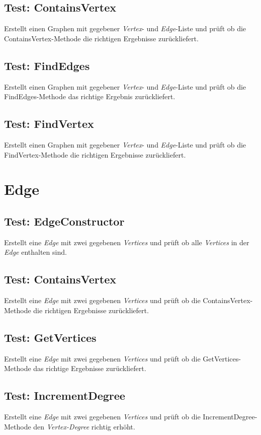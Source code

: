 \documentclass[13pt]{scrreprt}
\begin{document}
\subsection{Test: ContainsVertex}
Erstellt einen Graphen mit gegebener \textit{Vertex}- und \textit{Edge}-Liste und prüft ob die ContainsVertex-Methode die richtigen Ergebnisse zurückliefert.

\subsection{Test: FindEdges}
Erstellt einen Graphen mit gegebener \textit{Vertex}- und \textit{Edge}-Liste und prüft ob die FindEdges-Methode das richtige Ergebnis zurückliefert.

\subsection{Test: FindVertex}
Erstellt einen Graphen mit gegebener \textit{Vertex}- und \textit{Edge}-Liste und prüft ob die FindVertex-Methode die richtigen Ergebnisse zurückliefert.

\newpage
\section{Edge}

\subsection{Test: EdgeConstructor}
Erstellt eine \textit{Edge} mit  zwei gegebenen \textit{Vertices} und prüft ob alle \textit{Vertices} in der \textit{Edge} enthalten sind.

\subsection{Test: ContainsVertex}
Erstellt eine \textit{Edge} mit  zwei gegebenen \textit{Vertices} und prüft ob die ContainsVertex-Methode die richtigen Ergebnisse zurückliefert.

\subsection{Test: GetVertices}
Erstellt eine \textit{Edge} mit  zwei gegebenen \textit{Vertices} und prüft ob die GetVertices-Methode das richtige Ergebnisse zurückliefert.

\subsection{Test: IncrementDegree}
Erstellt eine \textit{Edge} mit  zwei gegebenen \textit{Vertices} und prüft ob die IncrementDegree-Methode den \textit{Vertex-Degree} richtig erhöht.
\end{document}
